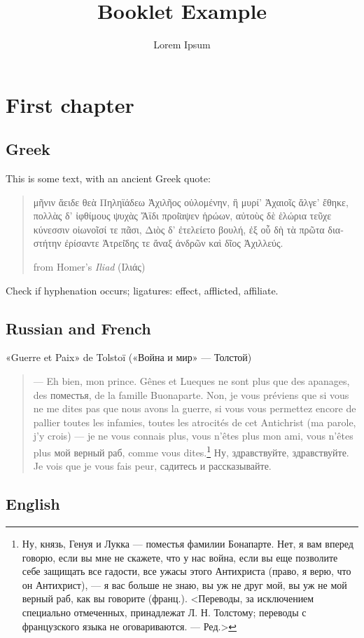 \documentclass[a4paper,10pt,twoside,titlepage]{book}
\title{Booklet Example}
\author{Lorem Ipsum}
\begin{document}
\setpdftargetpages

\maketitle
\chapter{First chapter}

\section{Greek}
This is some text, with an ancient Greek quote: 
\begin{quotation}
\begin{greek}
μῆνιν ἄειδε θεὰ Πηληϊάδεω Ἀχιλῆος οὐλομένην, ἣ μυρί' Ἀχαιοῖς ἄλγε'
ἔθηκε, πολλὰς δ' ἰφθίμους ψυχὰς Ἄϊδι προί̈αψεν ἡρώων, αὐτοὺς δὲ ἑλώρια
τεῦχε κύνεσσιν οἰωνοῖσί τε πᾶσι, Διὸς δ' ἐτελείετο βουλή, ἐξ οὗ δὴ τὰ
πρῶτα διαστήτην ἐρίσαντε Ἀτρεί̈δης τε ἄναξ ἀνδρῶν καὶ δῖος Ἀχιλλεύς.
\end{greek}
\begin{flushright}
from Homer's \textit{Iliad}  (\textgreek{Ιλιάς})
\end{flushright}
\end{quotation}

Check if hyphenation occurs; ligatures: effect, afflicted, affiliate.


\section{Russian and French}

\textfrench{«Guerre et Paix» de Tolstoï} (\textrussian{«Война и мир» — Толстой})

\begin{quotation}
\begin{french}
— Eh bien, mon prince. Gênes et Lueques ne sont plus que des apanages,
des поместья, de la famille Buonaparte. Non, je vous préviens que si
vous ne me dites pas que nous avons la guerre, si vous vous permettez
encore de pallier toutes les infamies, toutes les atrocités de cet
Antichrist (ma parole, j’y crois) — je ne vous connais plus, vous
n’êtes plus mon ami, vous n’êtes plus \textrussian{мой верный раб,
comme vous dites.\footnote{Ну, князь, Генуя и Лукка — поместья фамилии
Бонапарте. Нет, я вам вперед говорю, если вы мне не скажете, что у нас
война, если вы еще позволите себе защищать все гадости, все ужасы
этого Антихриста (право, я верю, что он Антихрист), — я вас больше не
знаю, вы уж не друг мой, вы уж не мой верный раб, как вы говорите
(франц.). <Переводы, за исключением специально отмеченных, принадлежат
Л. Н. Толстому; переводы с французского языка не оговариваются. —
Ред.>} Ну, здравствуйте, здравствуйте.} Je vois que je vous fais peur,
садитесь и рассказывайте.
\end{french}
\end{quotation}


\section{English}

\Blindtext

\clearpage \pagestyle{empty} \hbox{} %
\end{document}
